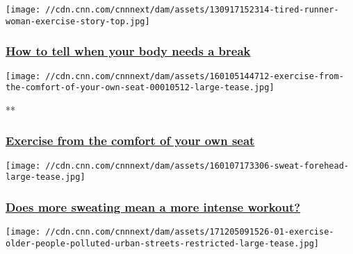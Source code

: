 \href{/2015/12/15/health/take-rest-day-exercise/index.html}{}

\texttt{[image: //cdn.cnn.com/cnnnext/dam/assets/130917152314-tired-runner-woman-exercise-story-top.jpg]}

\hypertarget{how-to-tell-when-your-body-needs-a-break}{%
\subsubsection{\texorpdfstring{\href{/2015/12/15/health/take-rest-day-exercise/index.html}{How
to tell when your body needs a
break}}{How to tell when your body needs a break}}\label{how-to-tell-when-your-body-needs-a-break}}

\href{/videos/living/2016/01/05/exercise-from-the-comfort-of-your-own-seat.cnn}{}

\texttt{[image: //cdn.cnn.com/cnnnext/dam/assets/160105144712-exercise-from-the-comfort-of-your-own-seat-00010512-large-tease.jpg]}

**

\hypertarget{exercise-from-the-comfort-of-your-own-seat}{%
\subsubsection{\texorpdfstring{\href{/videos/living/2016/01/05/exercise-from-the-comfort-of-your-own-seat.cnn}{Exercise
from the comfort of your own
seat}}{Exercise from the comfort of your own seat}}\label{exercise-from-the-comfort-of-your-own-seat}}

\href{/2017/06/13/health/sweating-workout-fitness-exercise-davis/index.html}{}

\texttt{[image: //cdn.cnn.com/cnnnext/dam/assets/160107173306-sweat-forehead-large-tease.jpg]}

\hypertarget{does-more-sweating-mean-a-more-intense-workout}{%
\subsubsection{\texorpdfstring{\href{/2017/06/13/health/sweating-workout-fitness-exercise-davis/index.html}{Does
more sweating mean a more intense
workout?}}{Does more sweating mean a more intense workout?}}\label{does-more-sweating-mean-a-more-intense-workout}}

\href{/2017/12/05/health/exercise-polluted-urban-streets-intl/index.html}{}

\texttt{[image: //cdn.cnn.com/cnnnext/dam/assets/171205091526-01-exercise-older-people-polluted-urban-streets-restricted-large-tease.jpg]}

